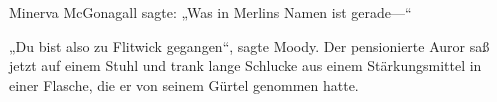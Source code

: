 Minerva McGonagall sagte: „Was in Merlins Namen ist gerade—“

\later

„Du bist also zu Flitwick gegangen“, sagte Moody. Der pensionierte Auror saß jetzt auf einem Stuhl und trank lange Schlucke aus einem Stärkungsmittel in einer Flasche, die er von seinem Gürtel genommen hatte.

